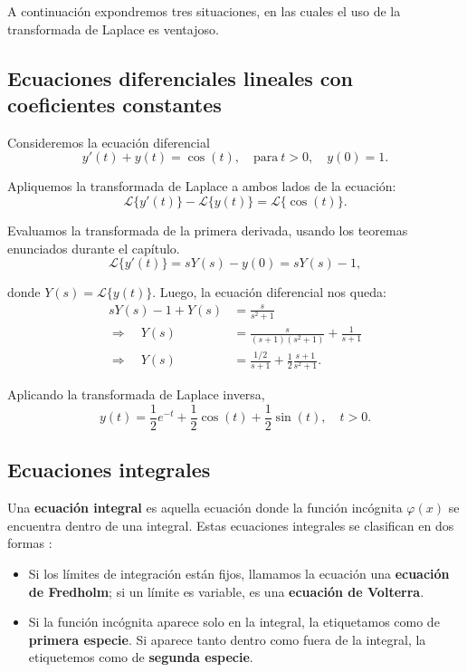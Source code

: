 A continuación expondremos tres situaciones, en las cuales el uso de la transformada de Laplace es ventajoso.

\subsection{Ecuaciones diferenciales lineales con coeficientes constantes}

\begin{ejemplo}
    Consideremos la ecuación diferencial
    $$y'(t) + y(t) = \cos(t), \quad \text{para} ~ t > 0, \quad y(0) = 1.$$

    Apliquemos la transformada de Laplace a ambos lados de la ecuación:
    $$\mathcal{L}\{y'(t)\} - \mathcal{L}\{y(t)\} = \mathcal{L}\{\cos(t)\}.$$

    Evaluamos la transformada de la primera derivada, usando los teoremas enunciados durante el capítulo.
    $$\mathcal{L}\{y'(t)\} = s Y(s) - y(0) = s Y(s) - 1,$$

    donde $Y(s) = \mathcal{L}\{y(t)\}$. Luego, la ecuación diferencial nos queda:
    \begin{align*}
        sY(s) - 1 + Y(s) &= \frac{s}{s^2+1} \\
        \Rightarrow \quad Y(s) &= \frac{s}{(s+1)(s^2+1)} + \frac{1}{s+1} \\
        \Rightarrow \quad Y(s) &= \frac{1/2}{s+1} + \frac{1}{2} \frac{s+1}{s^2+1}.
    \end{align*}

    Aplicando la transformada de Laplace inversa,
    $$y(t) = \frac{1}{2} e^{-t} + \frac{1}{2} \cos(t) + \frac{1}{2} \sin(t), \quad t > 0.$$
\end{ejemplo}

\subsection{Ecuaciones integrales}

Una \textbf{ecuación integral} es aquella ecuación donde la función incógnita $\varphi(x)$ se encuentra dentro de una integral. Estas ecuaciones integrales se clasifican en dos formas \cite{Arfken}:
\begin{itemize}
    \item Si los límites de integración están fijos, llamamos la ecuación una \textbf{ecuación de Fredholm}; si un límite es variable, es una \textbf{ecuación de Volterra}.

    \item Si la función incógnita aparece solo en la integral, la etiquetamos como de \textbf{primera especie}. Si aparece tanto dentro como fuera de la integral, la etiquetemos como de \textbf{segunda especie}.
\end{itemize}

